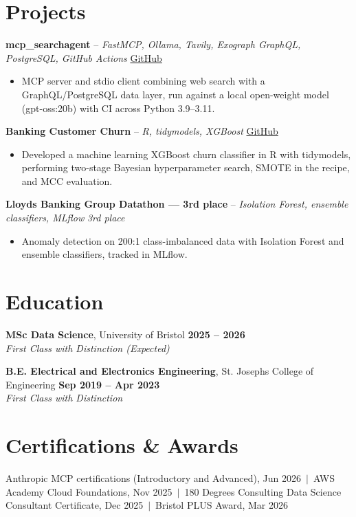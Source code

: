 \documentclass[a4paper,11pt]{article}
\begin{document}
\section{Projects}
\noindent\textbf{mcp\_searchagent} -- \textit{FastMCP, Ollama, Tavily, Exograph GraphQL, PostgreSQL, GitHub Actions} \hfill \href{https://github.com/Thiruvel-AP/mcp_searchagent}{GitHub}
\begin{itemize}
  \item MCP server and stdio client combining web search with a GraphQL/PostgreSQL data layer, run against a local open-weight model (gpt-oss:20b) with CI across Python 3.9–3.11.
\end{itemize}
\vspace{3pt}
\noindent\textbf{Banking Customer Churn} -- \textit{R, tidymodels, XGBoost} \hfill \href{https://github.com/Thiruvel-AP/Banking-Customer-Churn-Prediction}{GitHub}
\begin{itemize}
  \item Developed a machine learning XGBoost churn classifier in R with tidymodels, performing two-stage Bayesian hyperparameter search, SMOTE in the recipe, and MCC evaluation.
\end{itemize}
\vspace{3pt}
\noindent\textbf{Lloyd\textquotesingle{}s Banking Group Datathon — 3rd place} -- \textit{Isolation Forest, ensemble classifiers, MLflow} \hfill \textit{3rd place}
\begin{itemize}
  \item Anomaly detection on 200:1 class-imbalanced data with Isolation Forest and ensemble classifiers, tracked in MLflow.
\end{itemize}

\section{Education}
\textbf{MSc Data Science}, University of Bristol \hfill \textbf{2025 – 2026}\\ \textit{First Class with Distinction (Expected)}\par
\vspace{3pt}
\textbf{B.E. Electrical and Electronics Engineering}, St. Joseph\textquotesingle{}s College of Engineering \hfill \textbf{Sep 2019 – Apr 2023}\\ \textit{First Class with Distinction}\par

\section{Certifications \& Awards}
Anthropic MCP certifications (Introductory and Advanced), Jun 2026 \,$|$\, AWS Academy Cloud Foundations, Nov 2025 \,$|$\, 180 Degrees Consulting Data Science Consultant Certificate, Dec 2025 \,$|$\, Bristol PLUS Award, Mar 2026
\end{document}

